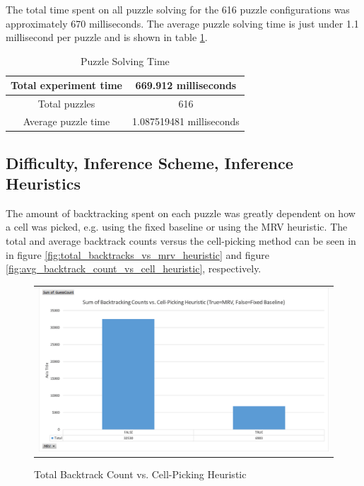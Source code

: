 \documentclass{article}
\begin{document}
The total time spent on all puzzle solving for the 616 puzzle configurations was approximately 670 milliseconds. The average puzzle solving time is just under 1.1 millisecond per puzzle and is shown in table \ref{table:puzzle_timing}.\\

\begin{table}[h!]
	\begin{center}
		\caption{Puzzle Solving Time}
		\label{table:puzzle_timing}
		\begin{tabular}{|c|c|}
			\hline 
			Total experiment time & 669.912	milliseconds \\ 
			\hline 
			Total puzzles & 616 \\ 
			\hline 
			Average puzzle time & 1.087519481 milliseconds \\ 
			\hline 
		\end{tabular}
	\end{center}
\end{table}

\subsection{Difficulty, Inference Scheme, Inference Heuristics}
The amount of backtracking spent on each puzzle was greatly dependent on how a cell was picked, e.g. using the fixed baseline or using the MRV heuristic. The total and average backtrack counts versus the cell-picking method can be seen in in figure \ref{fig:total_backtracks_vs_mrv_heuristic} and figure \ref{fig:avg_backtrack_count_vs_cell_heuristic}, respectively.\\

\begin{figure}[H]%
	\centering\begin{tabular}{c}
		\includegraphics[scale=0.4]{plots/sum-backtrack-count-vs-cell-picking-heuristic.png}\\
	\end{tabular}
	\caption{Total Backtrack Count vs. Cell-Picking Heuristic}%
	\label{fig:sum_backtrack_count_vs_cell_heuristic}%
\end{figure}
\end{document}
